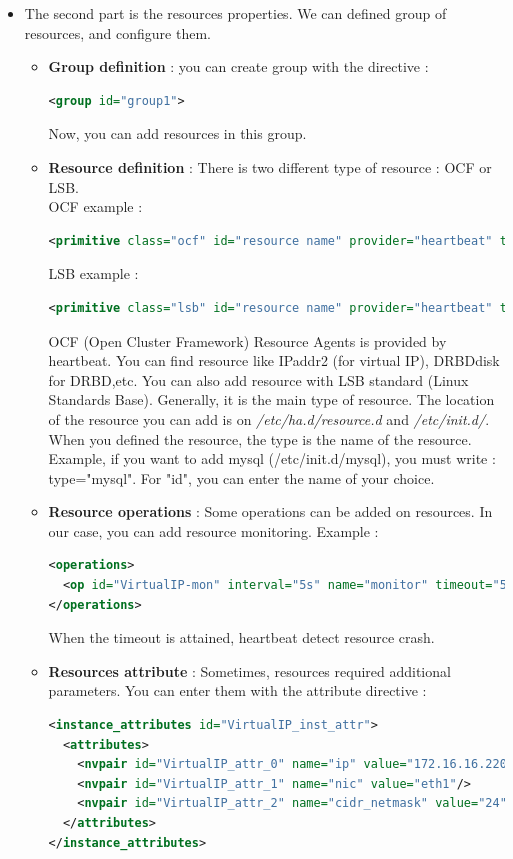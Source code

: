 \documentclass[a4paper,10pt]{report}
\begin{document}
\begin{itemize}
\item The second part is the resources properties. We can defined group of resources, and configure them.

\begin{itemize}
\item \textbf{Group definition} : you can create group with the directive :
\begin{lstlisting}[language=xml]
<group id="group1">
\end{lstlisting}
Now, you can add resources in this group.
\item \textbf{Resource definition} : There is two different type of resource : OCF or LSB.\\
OCF example : 
\begin{lstlisting}[language=xml]
<primitive class="ocf" id="resource name" provider="heartbeat" type="resource-name">
\end{lstlisting}
LSB example : 
\begin{lstlisting}[language=xml]
<primitive class="lsb" id="resource name" provider="heartbeat" type="resource-name">
\end{lstlisting}
OCF (Open Cluster Framework) Resource Agents is provided by heartbeat. You can find resource like IPaddr2 (for virtual IP), DRBDdisk for DRBD,etc.
You can also add resource with LSB standard (Linux Standards Base). Generally, it is the main type of resource. The location of the resource you can add is on \textit{/etc/ha.d/resource.d} and \textit{/etc/init.d/}.
When you defined the resource, the type is the name of the resource. Example, if you want to add mysql (/etc/init.d/mysql), you must write : type="mysql". For "id", you can enter the name of your choice.
\item \textbf{Resource operations} : Some operations can be added on resources. In our case, you can add resource monitoring. Example :
\begin{lstlisting}[language=xml]
<operations>
  <op id="VirtualIP-mon" interval="5s" name="monitor" timeout="5s"/>
</operations>
\end{lstlisting}
When the timeout is attained, heartbeat detect resource crash.
\item \textbf{Resources attribute} : Sometimes, resources required additional parameters. You can enter them with the attribute directive :
\begin{lstlisting}[language=xml]
<instance_attributes id="VirtualIP_inst_attr">
  <attributes>
    <nvpair id="VirtualIP_attr_0" name="ip" value="172.16.16.220"/>
    <nvpair id="VirtualIP_attr_1" name="nic" value="eth1"/>
    <nvpair id="VirtualIP_attr_2" name="cidr_netmask" value="24"/>
  </attributes>
</instance_attributes>
\end{lstlisting}


\end{itemize}
\end{itemize}
\end{document}
